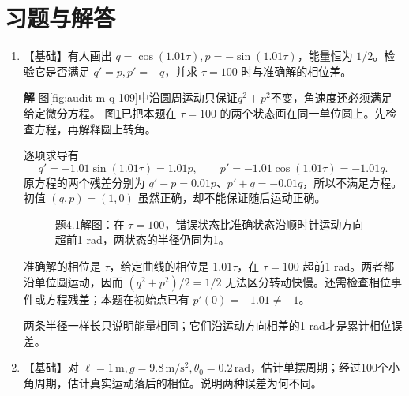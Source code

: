 \documentclass[11pt,openany,fontset=fandol]{ctexbook}
\theoremstyle{plain}\newtheorem{theorem}{定理}[chapter]\newtheorem{proposition}[theorem]{命题}
\theoremstyle{definition}\newtheorem{definition}{定义}[chapter]\newtheorem{example}{例}[chapter]
\theoremstyle{remark}\newtheorem*{remark}{说明}
\newcommand{\SolutionStart}{\par\nobreak\medskip\nobreak\noindent\textbf{解}\quad\ignorespaces}
\newenvironment{solution}{\SolutionStart}{\par\medskip}
\begin{document}
\section*{习题与解答}
\begin{enumerate}[label=4.\arabic*,itemsep=3pt]
\item \begin{minipage}[t]{\linewidth}
【基础】有人画出 $q=\cos(1.01\tau),p=-\sin(1.01\tau)$，能量恒为 $1/2$。检验它是否满足 $q'=p,p'=-q$，并求 $\tau=100$ 时与准确解的相位差。
\end{minipage}

\begin{solution}
图\ref{fig:audit-m-q-109}中沿圆周运动只保证$q^2+p^2$不变，角速度还必须满足给定微分方程。
图\ref{fig:hw-4-1}已把本题在 $\tau=100$ 的两个状态画在同一单位圆上。先检查方程，再解释圆上转角。

逐项求导有
\[
q'=-1.01\sin(1.01\tau)=1.01p,\qquad
p'=-1.01\cos(1.01\tau)=-1.01q.
\]
原方程的两个残差分别为 $q'-p=0.01p$、$p'+q=-0.01q$，所以不满足方程。初值 $(q,p)=(1,0)$ 虽然正确，却不能保证随后运动正确。

\begin{figure}[H]\centering
{}
\caption{题4.1解图：在 $\tau=100$，错误状态比准确状态沿顺时针运动方向超前1 rad，两状态的半径仍同为1。}\label{fig:hw-4-1}
\end{figure}

准确解的相位是 $\tau$，给定曲线的相位是 $1.01\tau$，在 $\tau=100$ 超前1 rad。两者都沿单位圆运动，因而 $(q^2+p^2)/2=1/2$ 无法区分转动快慢。还需检查相位事件或方程残差；本题在初始点已有 $p'(0)=-1.01\ne-1$。

两条半径一样长只说明能量相同；它们沿运动方向相差的1 rad才是累计相位误差。
\end{solution}

\item \begin{minipage}[t]{\linewidth}
【基础】对 $\ell=1\,\mathrm m,g=9.8\,\mathrm{m/s^2},\theta_0=0.2\,\mathrm{rad}$，估计单摆周期；经过100个小角周期，估计真实运动落后的相位。说明两种误差为何不同。


\end{minipage}
\end{enumerate}
\end{document}
